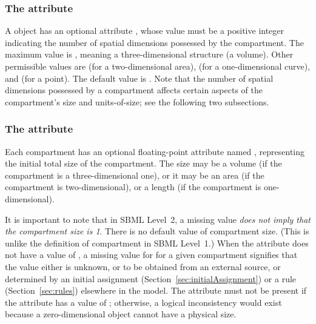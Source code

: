 \subsubsection{The  attribute}

A \Compartment object has an optional attribute
, whose value must be a positive integer
indicating the number of spatial dimensions possessed by the
compartment.  The maximum value is , meaning a
three-dimensional structure (a volume).  Other permissible values
are  (for a two-dimensional area),  (for a
one-dimensional curve), and  (for a point).  The default
value is . Note that the number of spatial dimensions
possessed by a compartment affects certain aspects of the
compartment's size and units-of-size; see the following two
subsections.


\subsubsection{The  attribute}
\label{sec:size}

Each compartment has an optional floating-point attribute named
, representing the initial total size of the
compartment.  The size may be a volume (if the compartment is a
three-dimensional one), or it may be an area (if the compartment
is two-dimensional), or a length (if the compartment is
one-dimensional).

It is important to note that in SBML Level~2, a missing
 value \emph{does not imply that the compartment size
  is 1}.  There is no default value of compartment size.  (This is
unlike the definition of compartment  in SBML
Level~1.)  When the  attribute does not have
a value of , a missing value for  for a given
compartment signifies that the value either is unknown, or to be
obtained from an external source, or determined by an initial
assignment (Section~\ref{sec:initialAssignment}) or a rule
(Section~\ref{sec:rules}) elsewhere in the model.  The
 attribute must not be present if the
 attribute has a value of ; otherwise,
a logical inconsistency would exist because a zero-dimensional
object cannot have a physical size.

